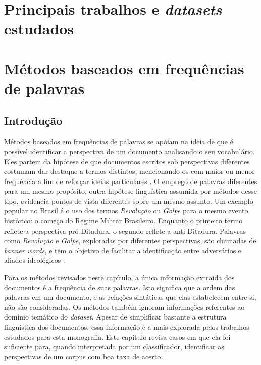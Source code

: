 \chapter{Principais trabalhos e \emph{datasets} estudados}

\chapter{Métodos baseados em frequências de palavras}

\section{Introdução}

Métodos baseados em frequências de palavras se apóiam na ideia de que é possível identificar a perspectiva de um documento analisando o seu vocabulário. Eles partem da hipótese de que documentos escritos sob perspectivas diferentes costumam dar destaque a termos distintos, mencionando-os com maior ou menor frequência a fim de reforçar ideias particulares \cite{teubert2001}. O emprego de palavras diferentes para um mesmo propósito, outra hipótese linguística assumida por métodos desse tipo, evidencia pontos de vista diferentes sobre um mesmo assunto. Um exemplo popular no Brasil é o uso dos termos \emph{Revolução} ou \emph{Golpe} para o mesmo evento histórico: o começo do Regime Militar Brasileiro. Enquanto o primeiro termo reflete a perspectiva pró-Ditadura, o segundo reflete a anti-Ditadura. Palavras como \emph{Revolução} e \emph{Golpe}, exploradas por diferentes perspectivas, são chamadas de \emph{banner words}, e têm o objetivo de facilitar a identificação entre adversários e aliados ideológicos \cite{teubert2001}.








Para os métodos revisados neste capítulo, a única informação extraída dos documentos é a frequência de suas palavras. Isto significa que a ordem das palavras em um documento, e as relações sintáticas que elas estabelecem entre si, não são consideradas. Os métodos também ignoram informações referentes ao domínio temático do \emph{dataset}. Apesar de simplificar bastante a estrutura linguística dos documentos, essa informação é a mais explorada pelos trabalhos estudados para esta monografia. Este capítulo revisa casos em que ela foi suficiente para, quando interpretada por um classificador, identificar as perspectivas de um corpus com boa taxa de acerto. 

